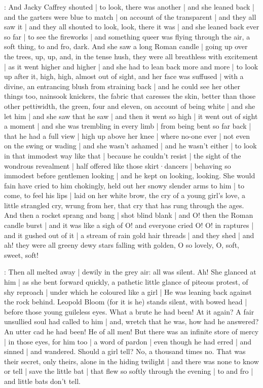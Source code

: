 :
And Jacky Caffrey shouted |
to look,
there was another |
and she leaned back |
and the garters were blue to match |
on account of the transparent |
and they all saw it |
and they all shouted to look,
look,
there it was |
and she leaned back ever so far |
to see the fireworks |
and something queer was flying through the air,
a soft thing,
to and fro,
dark.
And she saw a long Roman candle |
going up over the trees,%
up,
up,
and,
in the tense hush,
they were all breathless with excitement |
as it went higher and higher |
and she had to lean back more and more |
to look up after it,
high,
high,
almost out of sight,
and her face was suffused |
with a divine,
an entrancing blush from straining back |
and he could see her other things too,
nainsook knickers,
the fabric that caresses the skin,
better than those other pettiwidth,
the green,
four and eleven,
on account of being white |
and she let him |
and she saw that he saw |
and then it went so high |
it went out of sight a moment |
and she was trembling in every limb |
from being bent so far back |
that he had a full view |
high up above her knee |
where no-one ever |
not even on the swing or wading |
and she wasn't ashamed |
and he wasn't either |%
to look in that immodest way like that |
because he couldn't resist |
the sight of the wondrous revealment |
half offered like those skirt·dancers |
behaving so immodest before gentlemen looking |
and he kept on looking,
looking.
She would fain have cried to him
chokingly,
held out her snowy slender arms to him |
to come,
to feel his lips |
laid on her white brow,
the cry of a young girl's love,
a little strangled cry,
wrung from her,
that cry
that has rung through the ages.
And then a rocket
sprang and bang |
shot blind blank |
and O!
then the Roman candle burst |
and it was like a sigh of O!
and everyone cried O!
O!
in raptures |
and it gushed out of it |
a stream of rain gold hair threads |
and they shed |
and ah!
they were
all greeny dewy stars falling with golden,%
O so lovely,
O,
soft,
sweet,
soft!

:
Then all melted away |
dewily in the grey air:
all was silent.
Ah!
She glanced at him |
as she bent forward quickly,
a pathetic little glance of piteous protest,
of shy reproach |
under which he coloured like a girl |
He was leaning back against the rock behind.
Leopold Bloom
(for it is he)
stands silent,
with bowed head |
before those young guileless eyes.
What a brute he had been!
At it again?
A fair unsullied soul had called to him |
and,
wretch that he was,
how had he answered?
An utter cad
he had been!
He of all men!
But there was an infinite store of mercy |
in those eyes,
for him too |
a word of pardon |
even though he had erred |
and sinned |
and wandered.
Should a girl tell?%
No,
a thousand times no.
That was their secret,
only theirs,
alone in the hiding twilight |
and there was none to know or tell |
save the little bat |
that flew so softly through the evening |
to and fro |
and little bats don't tell.

